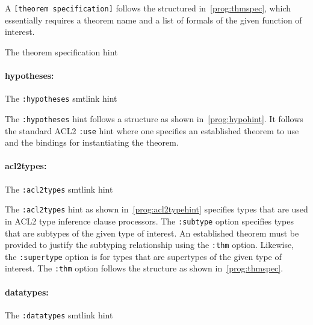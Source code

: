 A \texttt{[theorem specification]} follows the structured in~\ref{prog:thmspec},
which essentially requires a theorem name and a list of formals of the given
function of interest.

\begin{program}[h]
  \caption{The theorem specification hint}
  \label{prog:thmspec}
  
\end{program}

\paragraph{hypotheses: }
\begin{program}[h]
  \caption{The \texttt{:hypotheses} smtlink hint}
  \label{prog:hypohint}
  
\end{program}

The \texttt{:hypotheses} hint follows a structure as shown
in~\ref{prog:hypohint}. It follows the standard ACL2 \texttt{:use} hint where
one specifies an established theorem to use and the bindings for instantiating
the theorem.

\paragraph{acl2types: }

\begin{program}[h]
  \caption{The \texttt{:acl2types} smtlink hint}
  \label{prog:acl2typehint}
  
\end{program}

The \texttt{:acl2types} hint as shown in~\ref{prog:acl2typehint} specifies types
that are used in ACL2 type inference clause processors. The \texttt{:subtype}
option specifies types that are subtypes of the given type of interest. An
established theorem must be provided to justify the subtyping relationship using
the \texttt{:thm} option. Likewise, the \texttt{:supertype} option is for types
that are supertypes of the given type of interest. The \texttt{:thm} option
follows the structure as shown in~\ref{prog:thmspec}.

\paragraph{datatypes: }

\begin{program}[h]
  \caption{The \texttt{:datatypes} smtlink hint}
  \label{prog:datatypehint}
  
\end{program}

